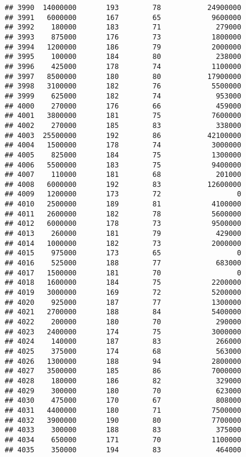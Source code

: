 \documentclass[
]{article}
\begin{document}
\begin{verbatim}
## 3990  14000000       193        78           24900000
## 3991   6000000       167        65            9600000
## 3992    180000       183        71             279000
## 3993    875000       176        73            1800000
## 3994   1200000       186        79            2000000
## 3995    100000       184        80             238000
## 3996    425000       178        74            1100000
## 3997   8500000       180        80           17900000
## 3998   3100000       182        76            5500000
## 3999    625000       182        74             953000
## 4000    270000       176        66             459000
## 4001   3800000       181        75            7600000
## 4002    270000       185        83             338000
## 4003  25500000       192        86           42100000
## 4004   1500000       178        74            3000000
## 4005    825000       184        75            1300000
## 4006   5500000       183        75            9400000
## 4007    110000       181        68             201000
## 4008   6000000       192        83           12600000
## 4009   1200000       173        72                  0
## 4010   2500000       189        81            4100000
## 4011   2600000       182        78            5600000
## 4012   6000000       178        73            9500000
## 4013    260000       181        79             429000
## 4014   1000000       182        73            2000000
## 4015    975000       173        65                  0
## 4016    525000       188        77             683000
## 4017   1500000       181        70                  0
## 4018   1600000       184        75            2200000
## 4019   3000000       169        72            5200000
## 4020    925000       187        77            1300000
## 4021   2700000       188        84            5400000
## 4022    200000       180        70             290000
## 4023   2400000       174        75            3000000
## 4024    140000       187        83             266000
## 4025    375000       174        68             563000
## 4026   1300000       188        94            2800000
## 4027   3500000       185        86            7000000
## 4028    180000       186        82             329000
## 4029    300000       180        70             623000
## 4030    475000       170        67             808000
## 4031   4400000       180        71            7500000
## 4032   3900000       190        80            7700000
## 4033    300000       188        83             375000
## 4034    650000       171        70            1100000
## 4035    350000       194        83             464000

\end{verbatim}
\end{document}
